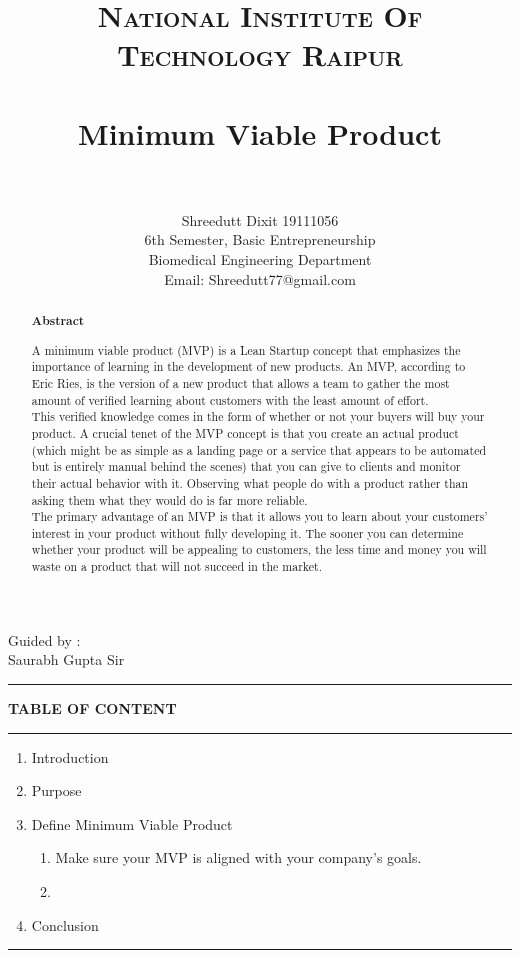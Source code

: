 \documentclass[paper=a4, fontsize=11pt]{scrartcl}
\title{
		\usefont{OT1}{bch}{b}{n}
		\normalfont \normalsize \textsc{National Institute Of Technology Raipur} \\ [25pt]
		\horrule{0.5pt} \\[0.4cm]
		\huge Minimum Viable Product  \\
		\horrule{2pt} \\[0.5cm]
}
\author{
        Shreedutt Dixit 19111056\\6th Semester, 
        Basic Entrepreneurship\\ Biomedical Engineering Department\\	
        Email: Shreedutt77@gmail.com
        \normalsize
}
\date{}
\numberwithin{equation}{section}		%
\numberwithin{figure}{section}			%
\numberwithin{table}{section}				%
\begin{document}
\maketitle
\begin{flushright}
    Guided by :\\
    Saurabh Gupta Sir
\end{flushright}

\noindent\rule{\textwidth}{1pt}
\begin{abstract}

    \begin{center}
        \Large{\textbf{Abstract}}\\
        
    \end{center}

    \Large { A minimum viable product (MVP) is a Lean Startup concept that emphasizes the importance of learning in the development of new products. An MVP, according to Eric Ries, is the version of a new product that allows a team to gather the most amount of verified learning about customers with the least amount of effort.\\
    This verified knowledge comes in the form of whether or not your buyers will buy your product.
    A crucial tenet of the MVP concept is that you create an actual product (which might be as simple as a landing page or a service that appears to be automated but is entirely manual behind the scenes) that you can give to clients and monitor their actual behavior with it. 
    \newpage Observing what people do with a product rather than asking them what they would do is far more reliable.\\
    The primary advantage of an MVP is that it allows you to learn about your customers' interest in your product without fully developing it. The sooner you can determine whether your product will be appealing to customers, the less time and money you will waste on a product that will not succeed in the market. }
\end{abstract}

\newpage
\textbf{TABLE OF CONTENT}\\
\rule{\textwidth}{1pt}
\begin{enumerate}
    \item Introduction
    \item Purpose
    \item Define Minimum Viable Product
    \begin{enumerate}
        \item Make sure your MVP is aligned with your company's goals.
        \item 
    \end{enumerate}
    \item Conclusion
\end{enumerate}
\rule{\textwidth}{1pt}
\newpage
\Large
\end{document}
